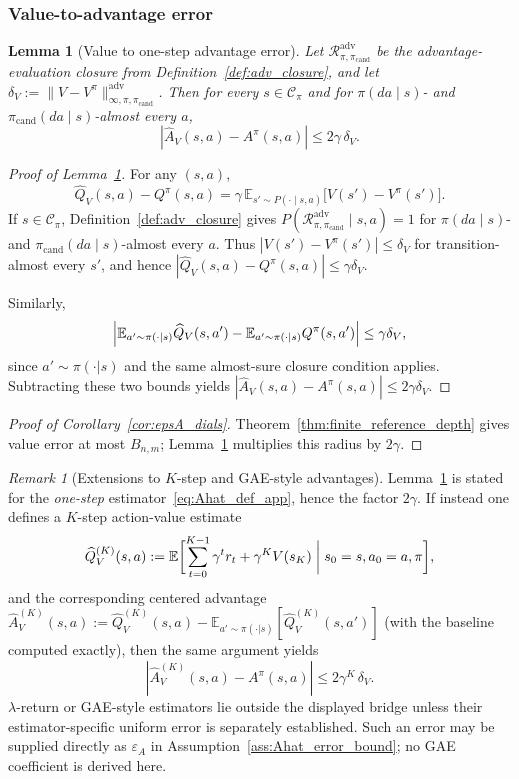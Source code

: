 \documentclass{article}
\theoremstyle{plain}
\newtheorem{lemma}[theorem]{Lemma}
\theoremstyle{definition}
\theoremstyle{remark}
\newtheorem{remark}[theorem]{Remark}
\newcommand{\E}{\mathbb{E}}
\begin{document}
\subsubsection{Value-to-advantage error}
\label{app:adv_bounds}

\begin{lemma}[Value to one-step advantage error]
\label{lem:A_error_app}
Let $\mathcal{R}_{\pi,\pi_{\mathrm{cand}}}^{\mathrm{adv}}$ be the advantage-evaluation closure from Definition~\ref{def:adv_closure},
and let $\delta_V := \|V-V^\pi\|_{\infty,\pi,\pi_{\mathrm{cand}}}^{\mathrm{adv}}$.
Then for every $s\in\mathcal C_\pi$ and for
$\pi(da\mid s)$- and $\pi_{\mathrm{cand}}(da\mid s)$-almost every $a$,
\[
|\widehat A_V(s,a) - A^\pi(s,a)| \le 2\gamma\,\delta_V.
\]
\end{lemma}

\begin{proof}[Proof of Lemma~\ref{lem:A_error_app}]
For any $(s,a)$,
\[
\widehat Q_V(s,a) - Q^\pi(s,a)
=
\gamma\,\E_{s'\sim P(\cdot\mid s,a)}\bigl[V(s')-V^\pi(s')\bigr].
\]
If $s\in\mathcal C_\pi$, Definition~\ref{def:adv_closure} gives
$P(\mathcal{R}_{\pi,\pi_{\mathrm{cand}}}^{\mathrm{adv}}\mid s,a)=1$
for $\pi(da\mid s)$- and $\pi_{\mathrm{cand}}(da\mid s)$-almost every $a$.
Thus $|V(s')-V^\pi(s')|\le \delta_V$ for transition-almost every $s'$, and hence
$|\widehat Q_V(s,a)-Q^\pi(s,a)|\le \gamma\delta_V$.

Similarly,
\[
\Bigl|\E_{a'\sim\pi(\cdot\mid s)}\widehat Q_V(s,a')-\E_{a'\sim\pi(\cdot\mid s)}Q^\pi(s,a')\Bigr|
\le \gamma\delta_V,
\]
since $a'\sim\pi(\cdot|s)$ and the same almost-sure closure condition applies.
Subtracting these two bounds yields
$|\widehat A_V(s,a)-A^\pi(s,a)|\le 2\gamma\delta_V$.
\end{proof}

\begin{proof}[Proof of Corollary~\ref{cor:epsA_dials}]
Theorem~\ref{thm:finite_reference_depth} gives value error at most $B_{n,m}$;
Lemma~\ref{lem:A_error_app} multiplies this radius by $2\gamma$.
\end{proof}
\begin{remark}[Extensions to $K$-step and GAE-style advantages]
\label{rem:A_error_kstep_app}
Lemma~\ref{lem:A_error_app} is stated for the \emph{one-step} estimator~\eqref{eq:Ahat_def_app}, hence the factor $2\gamma$.
If instead one defines a $K$-step action-value estimate
\begin{equation*}
\widehat Q_V^{(K)}(s,a) :=
\E\biggl[\sum_{t=0}^{K-1}\gamma^t r_t + \gamma^K V(s_K) \biggm| s_0=s, a_0=a, \pi\biggr],
\end{equation*}
and the corresponding centered advantage
$\widehat A_V^{(K)}(s,a):=\widehat Q_V^{(K)}(s,a)-\E_{a'\sim\pi(\cdot|s)}[\widehat Q_V^{(K)}(s,a')]$
(with the baseline computed exactly), then the same argument yields
\[
|\widehat A_V^{(K)}(s,a)-A^\pi(s,a)| \le 2\gamma^K\,\delta_V.
\]
$\lambda$-return or GAE-style estimators lie outside the displayed bridge unless their estimator-specific uniform error is separately established. Such an error may be supplied directly as $\varepsilon_A$ in Assumption~\ref{ass:Ahat_error_bound}; no GAE coefficient is derived here.
\end{remark}
\end{document}
